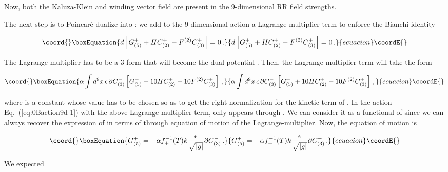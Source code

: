 \documentclass[12pt,a4paper]{article}
\begin{document}
\noindent Now, both the Kaluza-Klein and winding vector field are
present in the 9-dimensional RR field strengths.

The next step is to Poincar\'e-dualize \coordHE{} into \coordHE{}:
we add to the 9-dimensional action a Lagrange-multiplier term to enforce the 
Bianchi identity

\begin{equation}\coord{}\boxEquation{
d\left[G^{+}_{(5)}+HC^{+}_{(2)}-F^{(2)}C^{+}_{(3)}\right]=0\, .  
}{
d\left[G^{+}_{(5)}+HC^{+}_{(2)}-F^{(2)}C^{+}_{(3)}\right]=0\, .  
}{ecuacion}\coordE{}\end{equation}

The Lagrange multiplier has to be a 3-form that will become the dual
potential \coordHE{}. Then, the Lagrange multiplier term will take
the form

\begin{equation}\coord{}\boxEquation{
\label{eq:lagragemultiplierterm}
\alpha\int d^{9}x\, \epsilon\, \partial C^{-}_{(3)} 
\left[G^{+}_{(5)}+10HC^{+}_{(2)}-10F^{(2)}C^{+}_{(3)}\right]\, ,
}{
\alpha\int d^{9}x\, \epsilon\, \partial C^{-}_{(3)} 
\left[G^{+}_{(5)}+10HC^{+}_{(2)}-10F^{(2)}C^{+}_{(3)}\right]\, ,
}{ecuacion}\coordE{}\end{equation}

\noindent where \myHighlight{$\alpha$}\coordHE{} is a constant whose value has to be chosen 
so as to get the right normalization for the kinetic term of
\coordHE{}. In the action Eq.~(\ref{eq:0Baction9d-1}) with the
above Lagrange-multiplier term, \coordHE{} only appears through
\coordHE{}. We can consider it as a functional of \coordHE{}
since we can always recover the expression of \coordHE{} in terms of 
\coordHE{} through equation of motion of the Lagrange-multiplier.
Now, the \coordHE{} equation of motion is

\begin{equation}\coord{}\boxEquation{
G^{+}_{(5)}= -\alpha f^{-1}_{+}(T) k\frac{\epsilon}{\sqrt{|g|}} 
\partial C^{-}_{(3)}\, .
}{
G^{+}_{(5)}= -\alpha f^{-1}_{+}(T) k\frac{\epsilon}{\sqrt{|g|}} 
\partial C^{-}_{(3)}\, .
}{ecuacion}\coordE{}\end{equation}

\noindent We expected 
\end{document}
